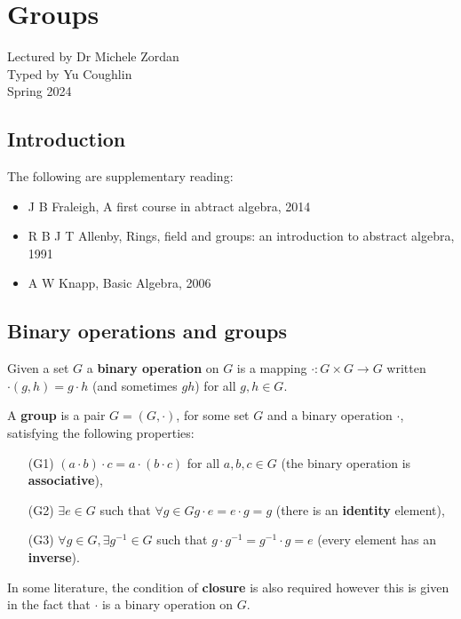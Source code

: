 \documentclass[../Year1/Year1.tex]{subfiles}
\begin{document}
\chapter{Groups}
\renewcommand*\thesection{\arabic{section}}
Lectured by Dr Michele Zordan \\ Typed by Yu Coughlin \\
Spring 2024

\section*{Introduction}


The following are supplementary reading:
\begin{itemize}
    \item J B Fraleigh, A first course in abtract algebra, 2014
    \item R B J T Allenby, Rings, field and groups: an introduction to abstract algebra, 1991
    \item A W Knapp, Basic Algebra, 2006
\end{itemize}

\tableofcontents\pagebreak

\section{Binary operations and groups}

\begin{definition}
    Given a set $G$ a \textbf{binary operation} on $G$ is a mapping $\cdot: G\times G \rightarrow G$ written $\cdot(g,h) = g\cdot h$ (and sometimes $gh$) for all $g,h\in G$.
\end{definition}

\begin{definition}[Group]
    A \textbf{group} is a pair $G=(G,\cdot)$, for some set $G$ and a binary operation $\cdot$, satisfying the following properties: \begin{enumerate}
        \item[(G1)] $(a\cdot b)\cdot c = a \cdot (b\cdot c)$ for all $a,b,c\in G$ (the binary operation is \textbf{associative}),
        \item[(G2)] $\exists e\in G$ such that $\forall g\in G g\cdot e = e\cdot g = g $ (there is an \textbf{identity} element),
        \item[(G3)] $\forall g\in G, \exists g^{-1} \in G$ such that $g\cdot g^{-1} = g^{-1}\cdot g = e$ (every element has an \textbf{inverse}).
    \end{enumerate}
    In some literature, the condition of \textbf{closure} is also required however this is given in the fact that $\cdot$ is a binary operation on $G$.
\end{definition}
\end{document}
